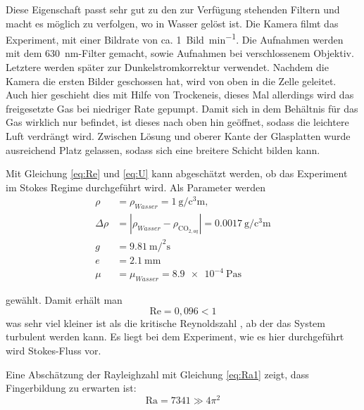 
Diese Eigenschaft passt sehr gut zu den zur Verfügung stehenden Filtern und macht es möglich zu verfolgen, wo \COT in Wasser gelöst ist.
Die Kamera filmt das Experiment, mit einer Bildrate von ca. \SI{1}{Bild\per\minute}.  Die Aufnahmen werden mit dem \SI{630}{\nano\meter}-Filter gemacht, sowie Aufnahmen bei verschlossenem Objektiv. Letztere werden später zur Dunkelstromkorrektur verwendet.
Nachdem die Kamera die ersten Bilder geschossen hat, wird von oben \COT in die Zelle geleitet. Auch hier geschieht dies mit Hilfe von 
Trockeneis, dieses Mal allerdings wird das freigesetzte Gas bei niedriger Rate gepumpt. Damit sich in dem Behältnis für das Gas wirklich nur \COT befindet, ist dieses nach oben hin geöffnet, sodass die leichtere Luft verdrängt wird. Zwischen Lösung und oberer Kante der Glasplatten wurde ausreichend Platz gelassen, sodass sich eine breitere \COTm Schicht bilden kann.

Mit Gleichung \ref{eq:Re} und \ref{eq:U} kann abgeschätzt werden, ob das Experiment im Stokes Regime durchgeführt wird. Als Parameter werden 
\begin{align*}
  \rho &= \rho_{Wasser} = \SI{1}{\g\per\cubic\centi\meter}, \\ 
  \Delta\rho &= \left| \rho_{Wasser} - \rho_{\mathrm{CO}_{2, aq}} \right| = \SI[round-precision=4]{0,0017}{\gram\per\cubic\centi\meter} \\
  g &= \SI[round-precision=2]{9,81}{\meter\per\squared\second} \\
  e &= \SI[round-precision=1]{2,1}{\milli\meter} \\
  \mu &= \mu_{Wasser} = \SI{8,9e-4}{\pascal\second}
\end{align*}

gewählt. Damit erhält man
\begin{equation}
 \mathrm{Re} = 0,096 < 1
\end{equation}
was sehr viel kleiner ist als die kritische Reynoldszahl , ab der das System turbulent werden kann. Es liegt bei dem Experiment, wie es hier durchgeführt wird Stokes-Fluss vor.

Eine Abschätzung der Rayleighzahl mit Gleichung \ref{eq:Ra1} zeigt, dass Fingerbildung zu erwarten ist:
\begin{equation}
 \mathrm{Ra} = 7341 \gg 4\pi^2
\end{equation}



